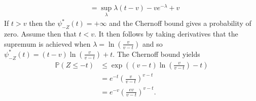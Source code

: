 \documentclass{article}
\theoremstyle{definition}
\theoremstyle{plain}
\theoremstyle{definition}
\begin{document}
\begin{enumerate}[wide, labelwidth=!, labelindent=0pt]
\begin{enumerate}
\begin{align*}
				&=\sup_{\lambda} \lambda(t-v) - ve^{-\lambda} + v
			\end{align*}
			If $t > v$ then the $\psi^*_{-Z}(t) = +\infty$ and the Chernoff bound gives a probability of zero. Assume then that $t < v$. It then follows by taking derivatives that the supremum is achieved when $\lambda = \ln(\frac{v}{v-t})$ and so $\psi^*_{-Z}(t) = (t-v)\ln(\frac{v}{v-t}) + t$. The Chernoff bound yields
			\begin{align*}
				\mathbb{P}(Z\leq -t) &\leq \exp\left((v-t)\ln\left(\frac{v}{v-t}\right) - t\right)\\
				&= e^{-t}\left(\frac{v}{v-t}\right)^{v-t}\\
				&= e^{-v}\left(\frac{ev}{v-t}\right)^{v-t}.\\
			\end{align*}
		\end{enumerate}
		
		
	\end{enumerate}
\end{document}
